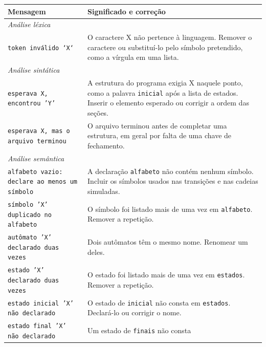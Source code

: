\documentclass[
    12pt
    ,oneside
    ,a4paper
    ,chapter=TITLE
    ,section=TITLE
    ,sumario=abnt-6027-2012]{abntex2}
\begin{document}
\begin{quadro}[h]
    \centering
    \caption{MENSAGENS DE DIAGNÓSTICO DA AUTOSIM}
    \label{quad:diagnosticos}
    \footnotesize
    \begin{tabular}{|p{}|p{}|}
        \hline
        \textbf{Mensagem} & \textbf{Significado e correção} \\
        \hline
        \multicolumn{2}{|l|}{\textit{Análise léxica}} \\
        \hline
        \texttt{token inválido `X`} & O caractere X não pertence à linguagem. Remover o
        caractere ou substituí-lo pelo símbolo pretendido, como a vírgula em uma lista. \\
        \hline
        \multicolumn{2}{|l|}{\textit{Análise sintática}} \\
        \hline
        \texttt{esperava X, encontrou 'Y'} & A estrutura do programa exigia X naquele
        ponto, como a palavra \texttt{inicial} após a lista de estados. Inserir o elemento
        esperado ou corrigir a ordem das seções. \\
        \hline
        \texttt{esperava X, mas o arquivo terminou} & O arquivo terminou antes de completar
        uma estrutura, em geral por falta de uma chave de fechamento. \\
        \hline
        \multicolumn{2}{|l|}{\textit{Análise semântica}} \\
        \hline
        \texttt{alfabeto vazio: declare ao menos um símbolo} & A declaração
        \texttt{alfabeto} não contém nenhum símbolo. Incluir os símbolos usados nas
        transições e nas cadeias simuladas. \\
        \hline
        \texttt{símbolo 'X' duplicado no alfabeto} & O símbolo foi listado mais de uma vez
        em \texttt{alfabeto}. Remover a repetição. \\
        \hline
        \texttt{autômato 'X' declarado duas vezes} & Dois autômatos têm o mesmo nome.
        Renomear um deles. \\
        \hline
        \texttt{estado 'X' declarado duas vezes} & O estado foi listado mais de uma vez em
        \texttt{estados}. Remover a repetição. \\
        \hline
        \texttt{estado inicial 'X' não declarado} & O estado de \texttt{inicial} não consta
        em \texttt{estados}. Declará-lo ou corrigir o nome. \\
        \hline
        \texttt{estado final 'X' não declarado} & Um estado de \texttt{finais} não consta

\end{tabular}
\end{quadro}
\end{document}
